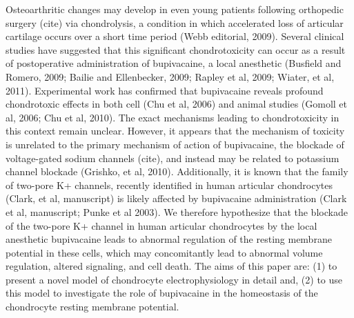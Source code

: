 Osteoarthritic changes may develop in even young patients following
orthopedic surgery (cite) via chondrolysis, a condition in which
accelerated loss of articular cartilage occurs over a short time
period (Webb editorial, 2009).  Several clinical studies have
suggested that this significant chondrotoxicity can occur as a result
of postoperative administration of bupivacaine, a local anesthetic
(Busfield and Romero, 2009; Bailie and Ellenbecker, 2009; Rapley et
al, 2009; Wiater, et al, 2011).  Experimental work has confirmed that
bupivacaine reveals profound chondrotoxic effects in both cell (Chu et
al, 2006) and animal studies (Gomoll et al, 2006; Chu et al, 2010).
The exact mechanisms leading to chondrotoxicity in this context remain
unclear.  However, it appears that the mechanism of toxicity is
unrelated to the primary mechanism of action of bupivacaine, the
blockade of voltage-gated sodium channels (cite), and instead may be
related to potassium channel blockade (Grishko, et al, 2010).
Additionally, it is known that the family of two-pore K+ channels,
recently identified in human articular chondrocytes (Clark, et al,
manuscript) is likely affected by bupivacaine administration (Clark et
al, manuscript; Punke et al 2003).  We therefore hypothesize that the
blockade of the two-pore K+ channel in human articular chondrocytes by
the local anesthetic bupivacaine leads to abnormal regulation of the
resting membrane potential in these cells, which may concomitantly
lead to abnormal volume regulation, altered signaling, and cell death.
The aims of this paper are: (1) to present a novel model of
chondrocyte electrophysiology in detail and, (2) to use this model to
investigate the role of bupivacaine in the homeostasis of the
chondrocyte resting membrane potential.

